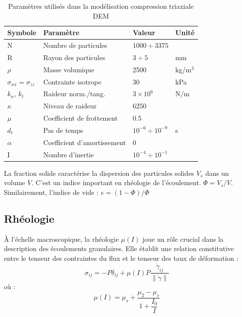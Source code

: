 \documentclass[5p,authoryear,square]{elsarticle}
\begin{document}
\begin{table}[htbp]
\centering
\footnotesize
\begin{tabular}{@{}llll@{}}
\toprule
\textbf{Symbole} & \textbf{Paramètre} & \textbf{Valeur} & \textbf{Unité} \\
\midrule
N & Nombre de particules & $1000 \div 3375$ &  \\
R & Rayon des particules & $3 \div 5 $& mm \\
$\rho$ & Masse volumique & 2500 & kg/m$^3$ \\
$\sigma_{xx} = \sigma_{zz}$ & Contrainte isotrope & 30 & kPa \\
$k_n$, $k_t$ & Raideur norm./tang. & $3 \times 10^6$ & N/m \\
$\kappa$ & Niveau de raideur & 6250 &  \\
$\mu$ & Coefficient de frottement & 0.5 &  \\
$d_t$ & Pas de temps & $10^{-6} \div 10^{-9}$ & s \\
$\alpha$ & Coefficient d'amortissement & 0 &  \\
I & Nombre d'inertie & $10^{-4} \div 10^{-1}$ &  \\
\bottomrule
\end{tabular}
\caption{Paramètres utilisés dans la modélisation compression triaxiale DEM}
\label{parametres_triaxiale}
\end{table}


La fraction solide caractérise la dispersion des particules solides $V_s$ dans un volume $V$.  
C'est un indice important en rhéologie de l'écoulement.  $\Phi = V_s/V$.
Similairement, l'indice de vide : $e = (1-\Phi)/\Phi$


\subsection{Rhéologie}\label{rheologie}

À l'échelle macroscopique, la rhéologie $\mu(I)$ joue un rôle crucial dans la description des écoulements granulaires. Elle établit une relation constitutive entre le tenseur des contraintes du flux et le tenseur des taux de déformation  \citep{jop2006constitutive} :
\begin{equation}
\sigma_{ij} = -P \delta_{ij} + \mu(I) P \frac{\dot{\gamma}_{ij}}{\lVert \dot{\gamma} \rVert}
\label{flowTensor}
\end{equation}
où :
\begin{equation}
\mu(I) = \mu_s + \dfrac{\mu_2 - \mu_s}{1 + \dfrac{I_0}{I}}
\label{muI}
\end{equation}
\end{document}
